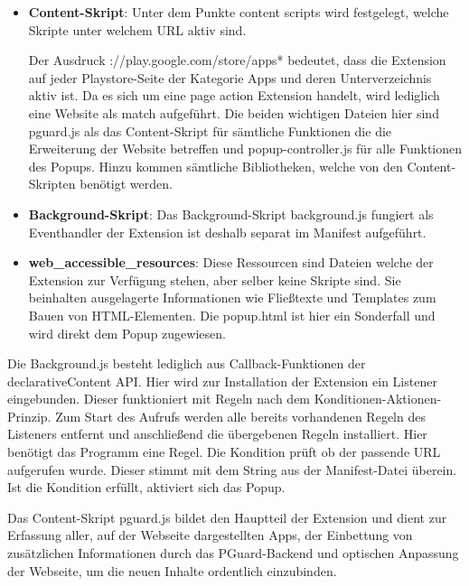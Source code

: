 \begin{itemize}
	\item \textbf{Content-Skript}:
	Unter dem Punkte \glqq content scripts \grqq{} wird festgelegt, welche Skripte unter welchem URL aktiv sind.
	
	Der Ausdruck \glqq *://play.google.com/store/apps*\grqq{}
	bedeutet, dass die Extension auf jeder Playstore-Seite der Kategorie Apps und deren Unterverzeichnis aktiv ist. Da es sich um eine \glqq page action\grqq{} Extension handelt, wird lediglich eine Website als \glqq match \grqq{} aufgeführt. Die beiden wichtigen Dateien hier sind \glqq pguard.js\grqq{} als das Content-Skript für sämtliche Funktionen die die Erweiterung der Website betreffen und \glqq popup-controller.js\grqq{} für alle Funktionen des Popups. Hinzu kommen sämtliche Bibliotheken, welche von den Content-Skripten benötigt werden.
	
	\item \textbf{Background-Skript}:
	Das Background-Skript \glqq background.js\grqq{} fungiert als Eventhandler der Extension ist deshalb separat im Manifest aufgeführt.
	
	\item \textbf{web\_accessible\_resources}:
	Diese Ressourcen sind Dateien welche der Extension zur Verfügung stehen, aber selber keine Skripte sind. Sie beinhalten ausgelagerte Informationen wie Fließtexte und Templates zum Bauen von HTML-Elementen. Die \glqq popup.html\grqq{} ist hier ein Sonderfall und wird direkt dem Popup zugewiesen.
\end{itemize}

Die Background.js besteht lediglich aus Callback-Funktionen der declarativeContent API. Hier wird zur Installation der Extension ein Listener eingebunden. Dieser funktioniert mit Regeln nach dem Konditionen-Aktionen-Prinzip. Zum Start des Aufrufs werden alle bereits vorhandenen Regeln des Listeners entfernt und anschließend die übergebenen Regeln installiert.
Hier benötigt das Programm eine Regel. Die Kondition prüft ob der passende URL aufgerufen wurde. Dieser stimmt mit dem String aus der Manifest-Datei überein. Ist die Kondition erfüllt, aktiviert sich das Popup.




Das Content-Skript pguard.js bildet den Hauptteil der Extension und dient zur Erfassung aller, auf der Webseite dargestellten Apps, der Einbettung von zusätzlichen Informationen durch das PGuard-Backend und optischen Anpassung der Webseite, um die neuen Inhalte ordentlich einzubinden.

